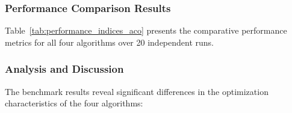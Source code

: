 \subsubsection{Performance Comparison Results}

Table~\ref{tab:performance_indices_aco} presents the comparative performance metrics for all four algorithms over 20 independent runs.

\begin{table}[H]
\centering
\small
\caption{Function Minimization: Performance Indices (20 Runs)}
\label{tab:performance_indices_aco}
%
\end{table}

\subsubsection{Analysis and Discussion}

The benchmark results reveal significant differences in the optimization characteristics of the four algorithms:

